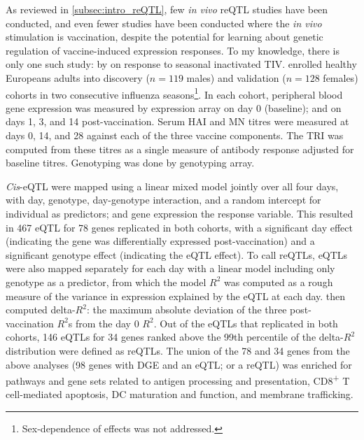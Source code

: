 As reviewed in \cref{subsec:intro_reQTL},
few \textit{in vivo} \gls{reQTL} studies have been conducted,
and even fewer studies have been conducted where the \textit{in vivo} stimulation is vaccination,
despite the potential for learning about genetic regulation of vaccine-induced expression responses.
To my knowledge, there is only one such study: by \textcite{franco2013IntegrativeGenomicAnalysis} on response to seasonal inactivated \gls{TIV}.
\textcite{franco2013IntegrativeGenomicAnalysis} enrolled healthy Europeans adults into discovery ($n=119$ males) and validation ($n=128$ females) cohorts in two consecutive influenza seasons\footnote{Sex-dependence of effects was not addressed.}.
In each cohort, peripheral blood gene expression was measured by expression array on day 0 (baseline); and on days 1, 3, and 14 post-vaccination.
Serum \gls{HAI} and \gls{MN} titres were measured at days 0, 14, and 28 against each of the three vaccine components.
The \gls{TRI} \autocite{bucasas2011EarlyPatternsGene} was computed from these titres as a single measure of antibody response adjusted for baseline titres.
Genotyping was done by genotyping array.

\textit{Cis}-\gls{eQTL} were mapped using a linear mixed model jointly over all four days,
with day, genotype, day-genotype interaction, and a random intercept for individual as predictors; and gene expression the response variable.
This resulted in 467 \gls{eQTL} for 78 genes replicated in both cohorts,
with a significant day effect (indicating the gene was differentially expressed post-vaccination)
and a significant genotype effect (indicating the \gls{eQTL} effect).
To call \glspl{reQTL}, \glspl{eQTL} were also mapped separately for each day with a linear model including only genotype as a predictor,
from which the model $R^2$ was computed as a rough measure of the variance in expression explained by the \gls{eQTL} at each day.
\textcite{franco2013IntegrativeGenomicAnalysis} then computed delta-$R^2$: the maximum absolute deviation of the three post-vaccination $R^2$s from the day 0 $R^2$.
Out of the \glspl{eQTL} that replicated in both cohorts, 
146 \glspl{eQTL} for 34 genes ranked above the 99th percentile of the delta-$R^2$ distribution were defined as \glspl{reQTL}.
The union of the 78 and 34 genes from the above analyses (98 genes with \gls{DGE} and an \gls{eQTL}; or a \gls{reQTL}) was enriched for pathways and gene sets related to  
antigen processing and presentation, CD8\textsuperscript{+} T cell-mediated apoptosis, \gls{DC} maturation and function, and membrane trafficking.


